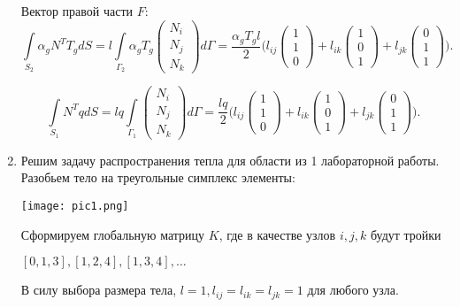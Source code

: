 \documentclass[a4paper, 12pt]{article}
\begin{document}
\begin{enumerate}
Вектор правой части \( F \):
\[
\int \limits_{S_2} \alpha_g N^T T_g dS = l \int\limits_{\Gamma_2} \alpha_g T_g 
\begin{pmatrix}
N_i \\
N_j \\
N_k
\end{pmatrix}
d\Gamma = \frac{\alpha_g T_g l}{2} 
\Bigg(
l_{ij} 
\begin{pmatrix}
1 \\
1 \\
0
\end{pmatrix}
+ l_{ik} 
\begin{pmatrix}
1 \\
0 \\
1
\end{pmatrix}
+ l_{jk} 
\begin{pmatrix}
0 \\
1 \\
1
\end{pmatrix}
\Bigg).
\]

\[
\int\limits_{S_1} N^T q dS = l q \int\limits_{\Gamma_1} 
\begin{pmatrix}
N_i \\
N_j \\
N_k
\end{pmatrix}
d\Gamma = \frac{l q}{2} 
\Bigg(
l_{ij} 
\begin{pmatrix}
1 \\
1 \\
0
\end{pmatrix}
+ l_{ik} 
\begin{pmatrix}
1 \\
0 \\
1
\end{pmatrix}
+ l_{jk} 
\begin{pmatrix}
0 \\
1 \\
1
\end{pmatrix}
\Bigg).
\]

\item Решим задачу распространения тепла для области из 1 лабораторной работы. Разобьем тело на треугольные симплекс элементы:
\begin{center}
\texttt{[image: pic1.png]}
\end{center}

Сформируем глобальную матрицу $K$, где в качестве узлов $i,j,k$ будут тройки 

$[0,1,3], [1,2,4], [1,3,4], \dots$ 

В силу выбора размера тела, $l = 1,
l_{ij} = l_{ik} = l_{jk} = 1$ для любого узла. 


\end{enumerate}
\end{document}
